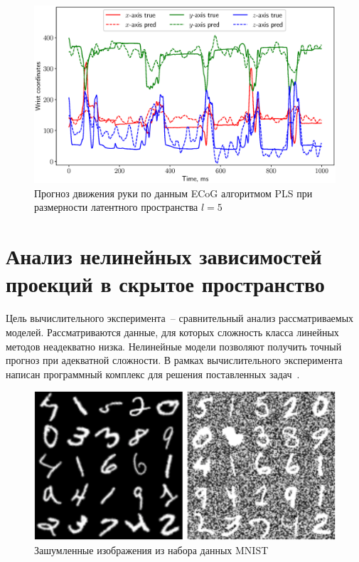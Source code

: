 \begin{figure}[ht]
	\centering
	\includegraphics[width=\textwidth]{figs/ch1/ecog_prediction}
	\caption{Прогноз движения руки по данным ECoG алгоритмом PLS при размерности латентного пространства $l=5$}
	\label{ch1:fig:ecog_prediction}
\end{figure}

\section{Анализ нелинейных зависимостей проекций в скрытое пространство}

Цель вычислительного эксперимента~-- сравнительный анализ рассматриваемых моделей.
Рассматриваются данные, для которых сложность класса линейных методов неадекватно низка.
Нелинейные модели позволяют получить точный прогноз при адекватной сложности.
В рамках вычислительного эксперимента написан программный комплекс для решения поставленных задач~\cite{source_code}.

\begin{figure}[!tp]
\centering 
\includegraphics[width=\linewidth]{figs/ch2/noisy_mnist}
\caption{Зашумленные изображения из набора данных MNIST}
\label{fgr:1}
\end{figure}


